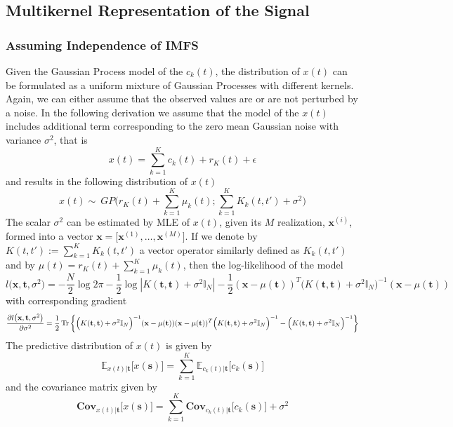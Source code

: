 \subsection{Multikernel Representation of the Signal}

\subsubsection{Assuming Independence of IMFS }
Given the Gaussian Process model of the $c_k(t)$, the distribution of $x(t)$ can be formulated as a uniform mixture of Gaussian Processes with different kernels.  Again, we can either assume that the observed values are or are not perturbed by a noise. In the following derivation we assume that the model of the $x(t)$ includes additional  term corresponding to the zero mean Gaussian noise with variance $\sigma^2$, that is
\begin{equation}
x(t) = \sum_{k = 1}^K c_k(t) + r_K(t) + \epsilon
\end{equation}
and results in the following distribution of $x(t)$ 
\begin{equation}
x(t) \sim ~   GP \bigg(r_K(t) + \sum_{k=1}^K \mu_k(t); \sum_{k=1}^K K_k(t,t') + \sigma^2 \bigg) 
\end{equation}
The scalar $\sigma^2$ can be estimated by MLE of $x(t)$, given its $M$ realization, $\mathbf{x}^{(i)}$, formed into a vector $\mathbf{x} = \big[\mathbf{x}^{(1)},\ldots, \mathbf{x}^{(M)} \big]$. If we denote by $K(t,t') := \sum_{k=1}^K K_k(t,t')$ a vector operator similarly defined as $K_k(t,t')$  and by $\mu(t) = r_K(t) + \sum_{k=1}^K \mu_k(t)$, then the log-likelihood of the model 
\begin{equation}
l\big( \mathbf{x}, \mathbf{t} , \sigma^2 \big) = - \frac{N}{2} \log 2 \pi - \frac{1}{2} \log |K(\mathbf{t},\mathbf{t}) + \sigma^2 \mathbb{I}_N | - \frac{1}{2}(\mathbf{x} - \mu(\mathbf{t}))^T \Big(K(\mathbf{t},\mathbf{t})   + \sigma^2 \mathbb{I}_N \Big)^{-1} (\mathbf{x} - \mu(\mathbf{t}))
\end{equation}
with corresponding gradient
\begin{equation*}
\frac{\partial l\big( \mathbf{x} , \mathbf{t} , \sigma^2 \big)}{\partial \sigma^2} = \frac{1}{2} \operatorname*{\text{Tr}} \bigg\{\Big(K(\mathbf{t},\mathbf{t}) + \sigma^2 \mathbb{I}_N\Big)^{-1}  (\mathbf{x} - \mu(\mathbf{t}))(\mathbf{x} - \mu(\mathbf{t}))^T\Big(K(\mathbf{t},\mathbf{t})  + \sigma^2 \mathbb{I}_N\Big)^{-1} -\Big(K(\mathbf{t},\mathbf{t})+ \sigma^2 \mathbb{I}_N\Big)^{-1}  \bigg\} 
\end{equation*}
The predictive distribution of $x(t)$ is given by 
\begin{equation*}
\mathbb{E}_{x(t)| \mathbf{t}} \big[x(\mathbf{s})] = \sum_{k = 1}^K \mathbb{E}_{c_k(t)|\mathbf{t}} \big[c_k(\mathbf{s})] 
\end{equation*}
and the covariance matrix given by
\begin{equation*}
\mathbf{Cov}_{x(t)|\mathbf{t}} \big[x(\mathbf{s})]  = \sum_{k = 1}^K\mathbf{Cov}_{c_k(t)|\mathbf{t}} \big[c_k(\mathbf{s})]  + \sigma^2
\end{equation*}


